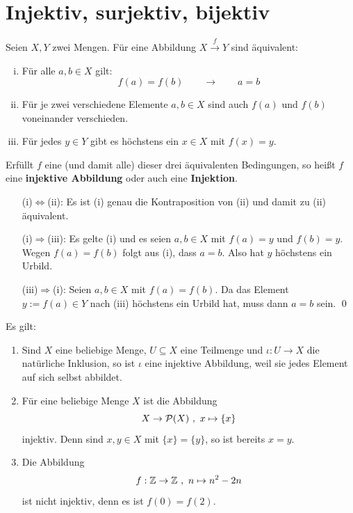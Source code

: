 \section{Injektiv, surjektiv, bijektiv}


\begin{defin} \label{def:injektiv} 
    Seien $X, Y$ zwei Mengen. Für eine Abbildung $X \xrightarrow{f} Y$ sind äquivalent:
    \begin{enumerate}[(i)]
        \item Für alle $a,b\in X$ gilt:
            \[ f(a)=f(b) \qquad\to\qquad a=b \]
        \item Für je zwei verschiedene Elemente $a,b \in X$ sind auch $f(a)$ und $f(b)$ voneinander verschieden.
        \item Für jedes $y\in Y$ gibt es höchstens ein $x\in X$ mit $f(x)=y$.
    \end{enumerate}
    Erfüllt $f$ eine (und damit alle) dieser drei äquivalenten Bedingungen, so heißt $f$ eine \textbf{injektive Abbildung} oder auch eine \textbf{Injektion}.
\end{defin}


\begin{bew} \quad
    \begin{itemize}
        \item[(i)$\Leftrightarrow$(ii):] Es ist (i) genau die Kontraposition von (ii) und damit zu (ii) äquivalent.
        \item[(i)$\Rightarrow$(iii):] Es gelte (i) und es seien $a,b\in X$ mit $f(a)=y$ und $f(b)=y$. Wegen $f(a)=f(b)$ folgt aus (i), dass $a=b$. Also hat $y$ höchstens ein Urbild.
        \item[(iii)$\Rightarrow$(i):] Seien $a,b\in X$ mit $f(a)=f(b)$. Da das Element $y:=f(a)\in Y$ nach (iii) höchstens ein Urbild hat, muss dann $a=b$ sein. \qed
    \end{itemize}
\end{bew}


\begin{bsp} Es gilt:
    \begin{enumerate}
        \item Sind $X$ eine beliebige Menge, $U\subseteq X$ eine Teilmenge und $\iota : U\to X$ die natürliche Inklusion, so ist $\iota$ eine injektive Abbildung, weil sie jedes Element auf sich selbst abbildet.
        \item Für eine beliebige Menge $X$ ist die Abbildung
            \[ X \to \mathcal P(X) \ ,\ x \mapsto \{x\} \]
        injektiv. Denn sind $x,y\in X$ mit $\{x\}=\{y\}$, so ist bereits $x=y$.
        \item Die Abbildung
            \[ f:\mathbb Z \to \mathbb Z \ ,\ n \mapsto n^2-2n \]
        ist nicht injektiv, denn es ist $f(0)=f(2)$.
    \end{enumerate}
\end{bsp}
	

